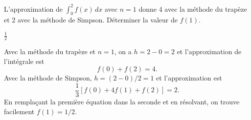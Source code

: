 \begin{exercice}
  L'approximation de $\int_0^2 f(x)\, dx$ avec $n = 1$ donne 4 avec la
  méthode du trapèze et 2 avec la méthode de Simpson. Déterminer la
  valeur de $f(1)$.
  \begin{rep}
    $\frac{1}{2}$
  \end{rep}
  \begin{sol}
    Avec la méthode du trapèze et $n = 1$, on a $h = 2 - 0 = 2$ et
    l'approximation de l'intégrale est
    \begin{equation*}
      f(0) + f(2) = 4.
    \end{equation*}
    Avec la méthode de Simpson, $h = (2 - 0)/2 = 1$ et l'approximation est
    \begin{equation*}
      \frac{1}{3}[f(0) + 4 f(1) + f(2)] = 2.
    \end{equation*}
    En remplaçant la première équation dans la seconde et en
    résolvant, on trouve facilement $f(1) = 1/2$.
  \end{sol}
\end{exercice}




